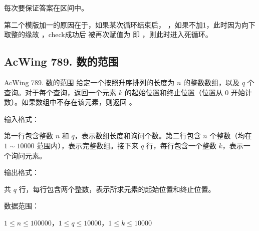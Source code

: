 \begin{keypoint}
    每次要保证答案在区间中。

    第二个模版加一的原因在于，如果某次循环结束后， ，如果不加1，此时因为向下取整的缘故 ，check成功后 被再次赋值为 即 ，则此时进入死循环。
\end{keypoint}

\subsection{AcWing 789. 数的范围}
\begin{titledbox}{AcWing 789. 数的范围}
    给定一个按照升序排列的长度为 $n$ 的整数数组，以及 $q$ 个查询。对于每个查询，返回一个元素 $k$ 的起始位置和终止位置（位置从 $0$ 开始计数）。如果数组中不存在该元素，则返回 。

    输入格式：

    第一行包含整数 $n$ 和 $q$，表示数组长度和询问个数。第二行包含 $n$ 个整数（均在 $1 \sim 10000$ 范围内），表示完整数组。接下来 $q$ 行，每行包含一个整数 $k$，表示一个询问元素。

    输出格式：

    共 $q$ 行，每行包含两个整数，表示所求元素的起始位置和终止位置。

    数据范围：

    $1 \le n \le 100000$，$1 \le q \le 10000$，$1 \le k \le 10000$

    \begin{inputblock}
         \\
         \\
         \\
         \\
    \end{inputblock}
    \begin{outputblock}
         \\
         \\
    \end{outputblock}
\end{titledbox}


